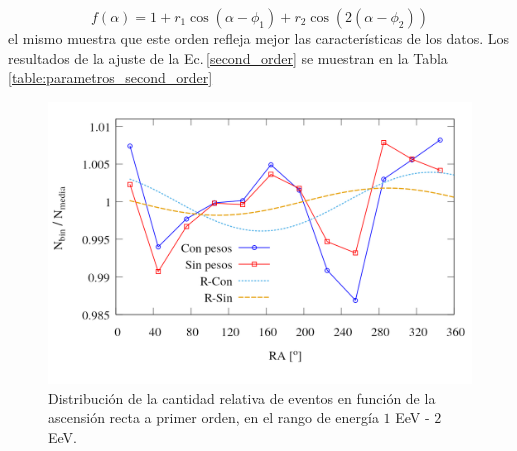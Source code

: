 \begin{equation}
	f(\alpha)= 1+ r_1\cos(\alpha -\phi_1) + r_2\cos(2(\alpha -\phi_2))
	\label{second_order}
\end{equation}
	el mismo muestra que este orden refleja mejor las características de los datos. Los resultados de la ajuste de la Ec.\,\ref{second_order}  se muestran en la Tabla\,\ref{table:parametros_second_order}
	\begin{figure}[H]
		\centering
		\includegraphics[width=0.65\linewidth]{eventos_clasificados_por_RA_v4.png}
		\caption{Distribución de la cantidad relativa de eventos en función de la ascensión recta a primer orden, en el rango de energía $1$ EeV - $2$ EeV.}
		\label{fig:bin_events_first_order}
	\end{figure}

